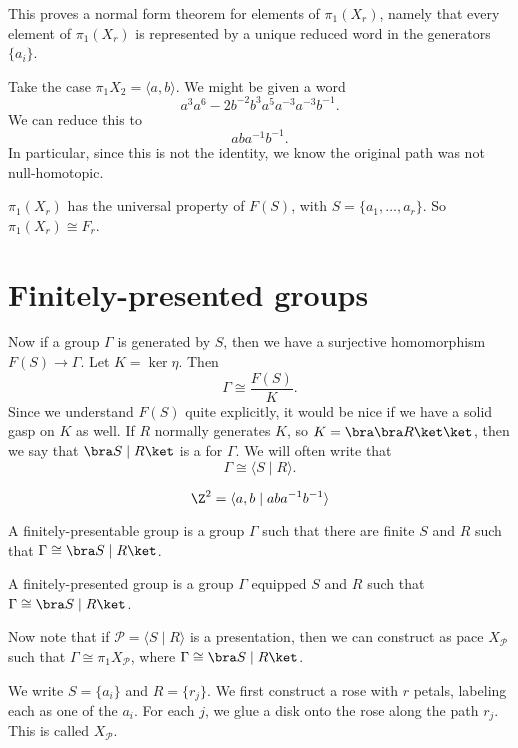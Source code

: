\documentclass[a4paper]{article}
\begin{document}
This proves a normal form theorem for elements of $\pi_1(X_r)$, namely that every element of $\pi_1(X_r)$ is represented by a unique reduced word in the generators $\{a_i\}$.

\begin{eg}
  Take the case $\pi_1 X_2 = \langle a, b\rangle$. We might be given a word
  \[
    a^3 a^6-2 b^{-2} b^3 a^5 a^{-3} a^{-3} b^{-1}.
  \]
  We can reduce this to
  \[
    a ba^{-1}b^{-1}.
  \]
  In particular, since this is not the identity, we know the original path was not null-homotopic.
\end{eg}

\begin{cor}
  $\pi_1(X_r)$ has the universal property of $F(S)$, with $S = \{a_1, \ldots, a_r\}$. So $\pi_1(X_r) \cong F_r$.
\end{cor}

\section{Finitely-presented groups}
Now if a group $\Gamma$ is generated by $S$, then we have a surjective homomorphism $F(S) \to \Gamma$. Let $K = \ker \eta$. Then
\[
  \Gamma \cong \frac{F(S)}{K}.
\]
Since we understand $F(S)$ quite explicitly, it would be nice if we have a solid gasp on $K$ as well. If $R$ normally generates $K$, so $K = \bra\bra R\ket\ket$, then we say that $\bra S \mid R \ket$ is a  for $\Gamma$. We will often write that
\[
  \Gamma \cong \langle S \mid R \rangle.
\]
\begin{eg}
  \[
    \Z^2 = \langle a, b\mid aba^{-1}b^{-1}\rangle
  \]
\end{eg}
\begin{defi}
  A finitely-presentable group is a group $\Gamma$ such that there are finite $S$ and $R$ such that $\Gamma \cong \bra S \mid R\ket$.

  A finitely-presented group is a group $\Gamma$ equipped $S$ and $R$ such that $\Gamma \cong \bra S \mid R \ket$.
\end{defi}

Now note that if $\mathcal{P} = \langle S \mid R \rangle$ is a presentation, then we can construct as pace $X_{\mathcal{P}}$ such that $\Gamma \cong \pi_1 X_{\mathcal{P}}$, where $\Gamma \cong \bra S \mid R\ket$.

We write $S = \{a_i\}$ and $R = \{r_j\}$. We first construct a rose with $r$ petals, labeling each as one of the $a_i$. For each $j$, we glue a disk onto the rose along the path $r_j$. This is called $X_{\mathcal{P}}$.
\end{document}
